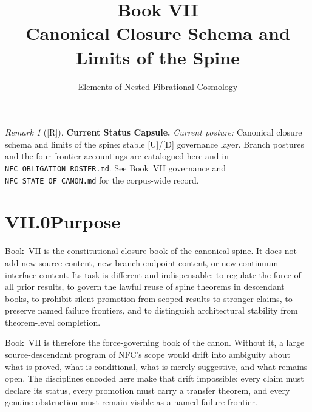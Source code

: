 \documentclass[12pt,oneside]{amsbook}
\theoremstyle{plain}
\theoremstyle{definition}
\theoremstyle{remark}
\newtheorem{remark}[theorem]{Remark}
\newcommand{\status}[1]{\textup{[#1]}}
\begin{document}
\title{Book VII\\[6pt]Canonical Closure Schema and Limits of the Spine}
\author{Elements of Nested Fibrational Cosmology}
\date{}
\maketitle

\tableofcontents

\bigskip


\begin{remark}[\status{R}]\label{cap:book7-status}
\textbf{Current Status Capsule.} \emph{Current posture:} Canonical closure schema and limits of the spine: stable [U]/[D] governance layer. Branch postures and the four frontier accountings are catalogued here and in \texttt{NFC\_OBLIGATION\_ROSTER.md}. See Book~VII governance and \texttt{NFC\_STATE\_OF\_CANON.md} for the corpus-wide record.
\end{remark}

\section*{VII.0\quad Purpose}

Book~VII is the constitutional closure book of the canonical spine.
It does not add new source content, new branch endpoint content, or
new continuum interface content.  Its task is different and
indispensable: to regulate the force of all prior results, to govern
the lawful reuse of spine theorems in descendant books, to prohibit
silent promotion from scoped results to stronger claims, to preserve
named failure frontiers, and to distinguish architectural stability
from theorem-level completion.

Book~VII is therefore the force-governing book of the canon.  Without
it, a large source-descendant program of NFC's scope would drift into
ambiguity about what is proved, what is conditional, what is merely
suggestive, and what remains open.  The disciplines encoded here make
that drift impossible: every claim must declare its status, every
promotion must carry a transfer theorem, and every genuine obstruction
must remain visible as a named failure frontier.
\end{document}
